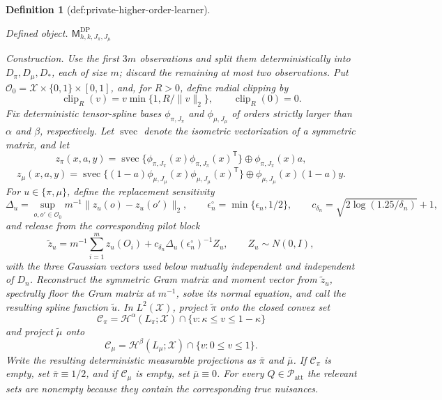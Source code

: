 \documentclass{article}
\newtheorem{definition}{Definition}
\begin{document}
\begin{definition}[def:private-higher-order-learner]\label{def:private-higher-order-learner}
\par\smallskip\noindent\emph{Defined object.} \(\mathsf M_{h,k,J_\pi,J_\mu}^{\mathrm{DP}}\)
\par\smallskip\noindent\emph{Construction.} Use the first \(3m\) observations and split them deterministically into \(D_\pi,D_\mu,D_*\), each of size \(m\); discard the remaining at most two observations.  Put \(\mathcal O_0=\mathcal X\times\{0,1\}\times[0,1]\), and, for \(R>0\), define radial clipping by
\[
 \operatorname{clip}_R(v)=v\min\{1,R/\lVert v\rVert_2\},
 \qquad \operatorname{clip}_R(0)=0.
\]
Fix deterministic tensor-spline bases \(\phi_{\pi,J_\pi}\) and \(\phi_{\mu,J_\mu}\) of orders strictly larger than \(\alpha\) and \(\beta\), respectively.  Let \(\operatorname{svec}\) denote the isometric vectorization of a symmetric matrix, and let
\[
 z_{\pi}(x,a,y)=\operatorname{svec}\{\phi_{\pi,J_\pi}(x)\phi_{\pi,J_\pi}(x)^{\mathsf T}\}
       \mathbin\oplus \phi_{\pi,J_\pi}(x)a,
\]
\[
 z_{\mu}(x,a,y)=\operatorname{svec}\{(1-a)\phi_{\mu,J_\mu}(x)\phi_{\mu,J_\mu}(x)^{\mathsf T}\}
       \mathbin\oplus \phi_{\mu,J_\mu}(x)(1-a)y.
\]
For \(u\in\{\pi,\mu\}\), define the replacement sensitivity
\[
 \Delta_u=\sup_{o,o'\in\mathcal O_0}m^{-1}\lVert z_u(o)-z_u(o')\rVert_2,
 \qquad
 \epsilon_n^\circ=\min\{\epsilon_n,1/2\},
 \qquad
 c_{\delta_n}=\sqrt{2\log(1.25/\delta_n)}+1,
\]
and release from the corresponding pilot block
\[
 \widetilde z_u=m^{-1}\sum_{i=1}^m z_u(O_i)
       +c_{\delta_n}\Delta_u(\epsilon_n^\circ)^{-1}Z_u,
 \qquad Z_u\sim N(0,I),
\]
with the three Gaussian vectors used below mutually independent and independent of \(D_n\).  Reconstruct the symmetric Gram matrix and moment vector from \(\widetilde z_u\), spectrally floor the Gram matrix at \(m^{-1}\), solve its normal equation, and call the resulting spline function \(\widetilde u\).  In \(L^2(\mathcal X)\), project \(\widetilde\pi\) onto the closed convex set
\[
 \mathcal C_\pi=\mathcal H^\alpha(L_\pi;\mathcal X)\cap\{v:\kappa\le v\le1-\kappa\}
\]
and project \(\widetilde\mu\) onto
\[
 \mathcal C_\mu=\mathcal H^\beta(L_\mu;\mathcal X)\cap\{v:0\le v\le1\}.
\]
Write the resulting deterministic measurable projections as \(\bar\pi\) and \(\bar\mu\).  If \(\mathcal C_\pi\) is empty, set \(\bar\pi\equiv1/2\), and if \(\mathcal C_\mu\) is empty, set \(\bar\mu\equiv0\).  For every \(Q\in\mathcal P_{\mathrm{att}}\) the relevant sets are nonempty because they contain the corresponding true nuisances.


\end{definition}
\end{document}
